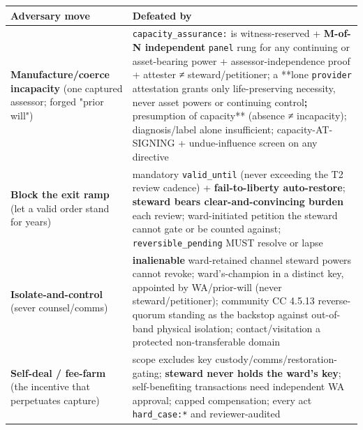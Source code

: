 \documentclass[11pt]{article}
\begin{document}
{\footnotesize
\begin{longtable}{|p{8.0cm}|p{8.0cm}|}\hline
\textbf{Adversary move} & \textbf{Defeated by} \\ \hline\endhead
\textbf{Manufacture/coerce incapacity} (one captured assessor; forged "prior will") & \texttt{capacity\_assurance:} is witness-reserved + \textbf{M-of-N independent} \texttt{panel} rung for any continuing or asset-bearing power + assessor-independence proof + attester ≠ steward/petitioner; a **lone \texttt{provider} attestation grants only life-preserving necessity, never asset powers or continuing control\textbf{; }presumption of capacity** (absence ≠ incapacity); diagnosis/label alone insufficient; capacity-AT-SIGNING + undue-influence screen on any directive \\ \hline
\textbf{Block the exit ramp} (let a valid order stand for years) & mandatory \texttt{valid\_until} (never exceeding the T2 review cadence) + \textbf{fail-to-liberty auto-restore}; \textbf{steward bears clear-and-convincing burden} each review; ward-initiated petition the steward cannot gate or be counted against; \texttt{reversible\_pending} MUST resolve or lapse \\ \hline
\textbf{Isolate-and-control} (sever counsel/comms) & \textbf{inalienable} ward-retained channel steward powers cannot revoke; ward's-champion in a distinct key, appointed by WA/prior-will (never steward/petitioner); community CC 4.5.13 reverse-quorum standing as the backstop against out-of-band physical isolation; contact/visitation a protected non-transferable domain \\ \hline
\textbf{Self-deal / fee-farm} (the incentive that perpetuates capture) & scope excludes key custody/comms/restoration-gating; \textbf{steward never holds the ward's key}; self-benefiting transactions need independent WA approval; capped compensation; every act \texttt{hard\_case:*} and reviewer-audited \\ \hline
\end{longtable}}
\end{document}
